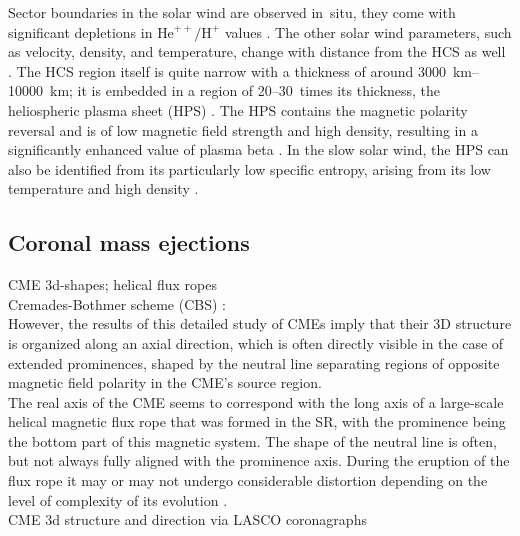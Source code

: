 Sector boundaries in the solar wind are observed in~situ, they come with significant depletions in $\text{He}^{++}\!/\text{H}^+$ values \citep{Borrini1981}. The other solar wind parameters, such as velocity, density, and temperature, change with distance from the HCS as well \citep{Smith2001}. The HCS region itself is quite narrow with a thickness of around \SIrange{3000}{10000}{\km}; it is embedded in a region of 20--30~times its thickness, the heliospheric plasma sheet (HPS) \citep{Winterhalter1994}. The HPS contains the magnetic polarity reversal and is of low magnetic field strength and high density, resulting in a significantly enhanced value of plasma beta \citep{Crooker2004}. In the slow solar wind, the HPS can also be identified from its particularly low specific entropy, arising from its low temperature and high density \citep{Kilpua2016}.


\subsection{Coronal mass ejections}
\label{sec:coronal_mass_ejections}


CME 3d-shapes; helical flux ropes\\
Cremades-Bothmer scheme (CBS) \citep{Cremades2004}:\\
However, the results of this detailed study of CMEs imply that their 3D structure is organized along an axial direction, which is often directly visible in the case of extended prominences, shaped by the neutral line separating regions of opposite magnetic field polarity in the CME’s source region.\\
The real axis of the CME seems to correspond with the long axis of a large-scale helical magnetic flux rope that was formed in the SR, with the prominence being the bottom part of this magnetic system. The shape of the neutral line is often, but not always fully aligned with the prominence axis. During the eruption of the flux rope it may or may not undergo considerable distortion depending on the level of complexity of its evolution \citep{Cremades2004}.\\
CME 3d structure and direction via LASCO coronagraphs\\


